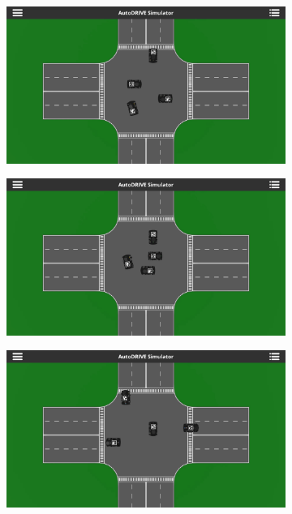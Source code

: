 \documentclass[letterpaper, 10 pt, conference]{ieeeconf}  %
\begin{document}
	\begin{figure}[t]
		\centering
		\begin{subfigure}[b]{0.16\linewidth}
			\centering
			\includegraphics[width=\linewidth]{Fig6a.png}
			\caption{}
			\label{fig6a}
		\end{subfigure}
		\hfill
		\begin{subfigure}[b]{0.16\linewidth}
			\centering
			\includegraphics[width=\linewidth]{Fig6b.png}
			\caption{}
			\label{fig6b}
		\end{subfigure}
		\hfill
		\begin{subfigure}[b]{0.16\linewidth}
			\centering
			\includegraphics[width=\linewidth]{Fig6c.png}

\end{subfigure}
\end{figure}
\end{document}
